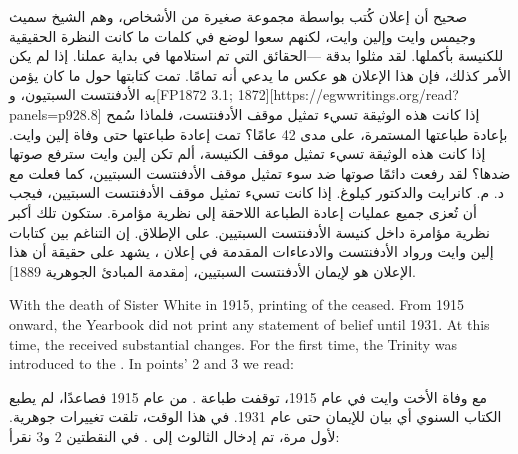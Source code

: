 صحيح أن إعلان  كُتب بواسطة مجموعة صغيرة من الأشخاص، وهم الشيخ سميث وجيمس وايت وإلين وايت، لكنهم سعوا لوضع في كلمات ما كانت النظرة الحقيقية للكنيسة بأكملها. لقد مثلوا بدقة —الحقائق التي تم استلامها في بداية عملنا. إذا لم يكن الأمر كذلك، فإن هذا الإعلان هو عكس ما يدعي أنه تمامًا. تمت كتابتها  حول ما كان يؤمن به الأدفنتست السبتيون،  و[FP1872 3.1; 1872][https://egwwritings.org/read?panels=p928.8] إذا كانت هذه الوثيقة تسيء تمثيل موقف الأدفنتست، فلماذا سُمح بإعادة طباعتها المستمرة، على مدى 42 عامًا؟ تمت إعادة طباعتها حتى وفاة إلين وايت. إذا كانت هذه الوثيقة تسيء تمثيل موقف الكنيسة، ألم تكن إلين وايت سترفع صوتها ضدها؟ لقد رفعت دائمًا صوتها ضد سوء تمثيل موقف الأدفنتست السبتيين، كما فعلت مع د. م. كانرايت والدكتور كيلوغ. إذا كانت  تسيء تمثيل موقف الأدفنتست السبتيين، فيجب أن تُعزى جميع عمليات إعادة الطباعة اللاحقة إلى نظرية مؤامرة. ستكون تلك أكبر نظرية مؤامرة داخل كنيسة الأدفنتست السبتيين. على الإطلاق. إن التناغم بين كتابات إلين وايت ورواد الأدفنتست والادعاءات المقدمة في إعلان ، يشهد على حقيقة أن هذا الإعلان هو  لإيمان الأدفنتست السبتيين، [مقدمة المبادئ الجوهرية 1889].


With the death of Sister White in 1915, printing of the  ceased. From 1915 onward, the Yearbook did not print any statement of belief until 1931. At this time, the  received substantial changes. For the first time, the Trinity was introduced to the . In points’ 2 and 3 we read:


مع وفاة الأخت وايت في عام 1915، توقفت طباعة . من عام 1915 فصاعدًا، لم يطبع الكتاب السنوي أي بيان للإيمان حتى عام 1931. في هذا الوقت، تلقت  تغييرات جوهرية. لأول مرة، تم إدخال الثالوث إلى . في النقطتين 2 و3 نقرأ:




